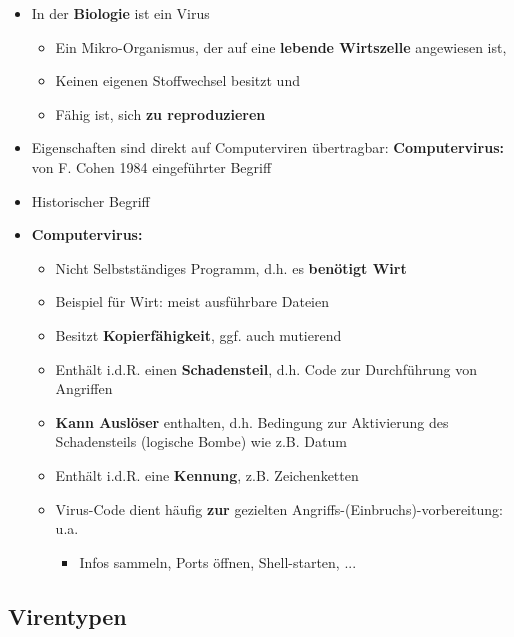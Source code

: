\documentclass[openany]{book}
\begin{document}
\begin{itemize}
    \item In der \textbf{Biologie} ist ein Virus
    \begin{itemize}
        \item Ein Mikro-Organismus, der auf eine \textbf{lebende Wirtszelle} angewiesen ist,
        \item Keinen eigenen Stoffwechsel besitzt und
        \item Fähig ist, sich \textbf{zu reproduzieren}
    \end{itemize}
    \item Eigenschaften sind direkt auf Computerviren übertragbar: \textbf{Computervirus:} von F. Cohen 1984 eingeführter Begriff
    \item Historischer Begriff
    \item \textbf{Computervirus:}
    \begin{itemize}
        \item Nicht Selbstständiges Programm, d.h. es \textbf{benötigt Wirt}
        \item Beispiel für Wirt: meist ausführbare Dateien
        \item Besitzt \textbf{Kopierfähigkeit}, ggf. auch mutierend
        \item Enthält i.d.R. einen \textbf{Schadensteil}, d.h. Code zur Durchführung von Angriffen
        \item \textbf{Kann Auslöser} enthalten, d.h. Bedingung zur Aktivierung des Schadensteils (logische Bombe) wie z.B. Datum
        \item Enthält i.d.R. eine \textbf{Kennung}, z.B. Zeichenketten
        \item Virus-Code dient häufig \textbf{zur} gezielten Angriffs-(Einbruchs)-vorbereitung: u.a.
        \begin{itemize}
            \item Infos sammeln, Ports öffnen, Shell-starten, ...
        \end{itemize}
    \end{itemize}
\end{itemize}

\subsection{Virentypen}
\end{document}

